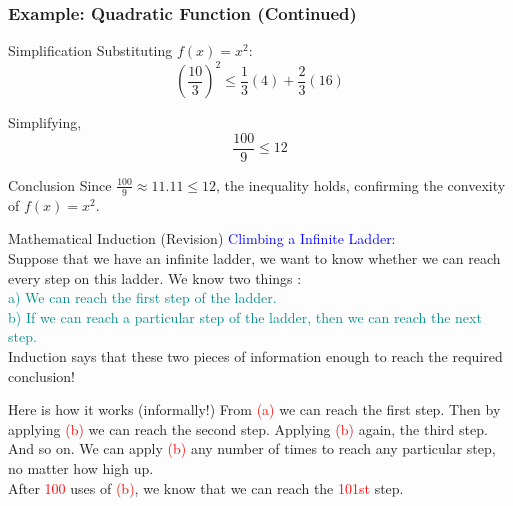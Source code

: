 \begin{frame}
\frametitle{Example: Quadratic Function (Continued)}
\begin{block}{Simplification}
    Substituting \( f(x) = x^2 \):
    \[ \left(\frac{10}{3}\right)^2 \leq \frac{1}{3} (4) + \frac{2}{3} (16) \]
    
    Simplifying,
    \[ \frac{100}{9} \leq 12 \]
\end{block}

\begin{block}{Conclusion}
    Since \( \frac{100}{9} \approx 11.11 \leq 12 \), the inequality holds, confirming the convexity of \( f(x) = x^2 \).
\end{block}
\end{frame}


\begin{frame}{Mathematical Induction (Revision)}
    \large\textcolor{blue}{Climbing a Infinite Ladder: }\\ 
     \vspace{0.4cm}
     \small
    Suppose that we have an infinite ladder,
    we want to know whether we can reach
    every step on this ladder. We know two
    things :\\
     \vspace{0.4cm}
    \textcolor{DarkCyan}{a) We can reach the first step of the ladder.}\\
    \textcolor{DarkCyan}{b) If we can reach a particular step of the ladder,
    then we can reach the next step.}\\
    Induction says that these two pieces of
    information enough to reach the required
    conclusion!\\
    \begin{block}{Here is how it works (informally!)}
        From \textcolor{red}{(a)} we can reach the first step. Then by applying \textcolor{red}{(b)} we can reach the second step. Applying \textcolor{red}{(b)} again, the third step.
        And so on. We can apply \textcolor{red}{(b)} any number of times to reach any
        particular step, no matter how high up.\\
         \vspace{0.2cm}
        After \textcolor{red}{100} uses of \textcolor{red}{(b)}, we know that we can
        reach the \textcolor{red}{101st} step.
    \end{block}
    
\end{frame}
    

